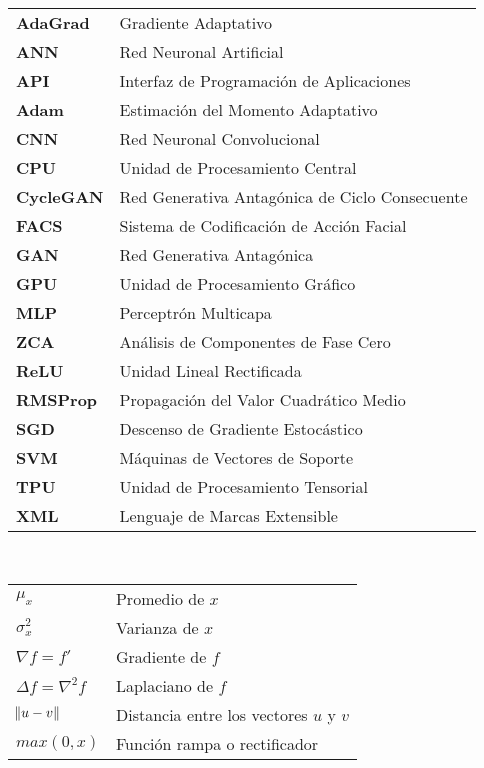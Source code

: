 \thispagestyle{plain}

\begin{abbreviations}
\begin{tabular}{l l}
    \\
    \textbf{AdaGrad} & Gradiente Adaptativo \\
    \textbf{ANN} & Red Neuronal Artificial \\
    \textbf{API} & Interfaz de Programación de Aplicaciones \\
    \textbf{Adam} & Estimación del Momento Adaptativo \\
    \textbf{CNN} & Red Neuronal Convolucional \\
    \textbf{CPU} & Unidad de Procesamiento Central \\
    \textbf{CycleGAN} & Red Generativa Antagónica de Ciclo Consecuente \\
    \textbf{FACS} & Sistema de Codificación de Acción Facial \\
    \textbf{GAN} & Red Generativa Antagónica \\
    \textbf{GPU} & Unidad de Procesamiento Gráfico \\
    \textbf{MLP} & Perceptrón Multicapa \\
    \textbf{ZCA} & Análisis de Componentes de Fase Cero \\
    \textbf{ReLU} & Unidad Lineal Rectificada \\
    \textbf{RMSProp} & Propagación del Valor Cuadrático Medio \\
    \textbf{SGD} & Descenso de Gradiente Estocástico \\
    \textbf{SVM} & Máquinas de Vectores de Soporte \\
    \textbf{TPU} & Unidad de Procesamiento Tensorial \\
    \textbf{XML} & Lenguaje de Marcas Extensible \\

\end{tabular}
\end{abbreviations}
\\
\begin{mathexprs}
\begin{tabular}{l l}
    \textbf{$\mu_x$} & Promedio de $x$ \\
    \textbf{$\sigma_{x}^{2}$} & Varianza de $x$ \\
    \textbf{$\nabla f = f'$} & Gradiente de $f$ \\
    \textbf{$\Delta f = \nabla^2 f$} & Laplaciano de $f$ \\
    \textbf{$\norm{u - v}$} & Distancia entre los vectores $u$ y $v$ \\
    \textbf{$max(0, x)$} & Función rampa o rectificador \\
    
  
\end{tabular}
\end{mathexprs}
